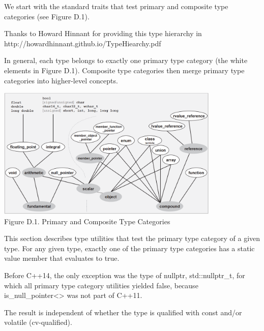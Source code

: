 
We start with the standard traits that test primary and composite type categories (see Figure D.1).

\begin{tcolorbox}[colback=webgreen!5!white,colframe=webgreen!75!black]
\hspace*{0.75cm}Thanks to Howard Hinnant for providing this type hierarchy in http://howardhinnant.github.io/TypeHiearchy.pdf
\end{tcolorbox}

In general, each type belongs to exactly one primary type category (the white elements in Figure D.1). Composite type categories then merge primary type categories into higher-level concepts.

\begin{center}
\includegraphics[width=0.8\textwidth]{content/Appendix/D/images/1.png} \\
Figure D.1. Primary and Composite Type Categories
\end{center}


This section describes type utilities that test the primary type category of a given type. For any given type, exactly one of the primary type categories has a static value member that evaluates to true.

\begin{tcolorbox}[colback=webgreen!5!white,colframe=webgreen!75!black]
\hspace*{0.75cm}Before C++14, the only exception was the type of nullptr, std::nullptr\_t, for which all primary type category utilities yielded false, because is\_null\_pointer<> was not part of C++11.
\end{tcolorbox}

The result is independent of whether the type is qualified with const and/or volatile (cv-qualified).

